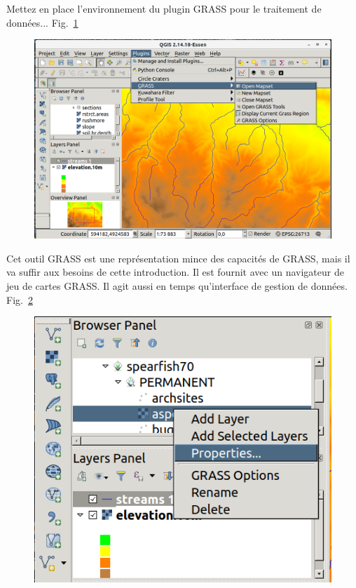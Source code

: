 Mettez en place l'environnement du plugin GRASS pour le traitement de donn\'ees... Fig.~\ref{fig:qgis029}

\begin{figure}[htbp]
   \centering
   \includegraphics[scale=0.2]{qgis029.png}
   \caption{}
   \label{fig:qgis029}
\end{figure}

Cet outil GRASS est une repr\'esentation mince des capacit\'es de GRASS, mais il va suffir aux besoins de cette introduction. Il est fournit avec un navigateur de jeu de cartes GRASS. Il agit aussi en temps qu'interface de gestion de donn\'ees. Fig.~\ref{fig:qgis030}

\begin{figure}[htbp]
   \centering
   \includegraphics[scale=0.4]{qgis030.png}
   \caption{}
   \label{fig:qgis030}
\end{figure}

